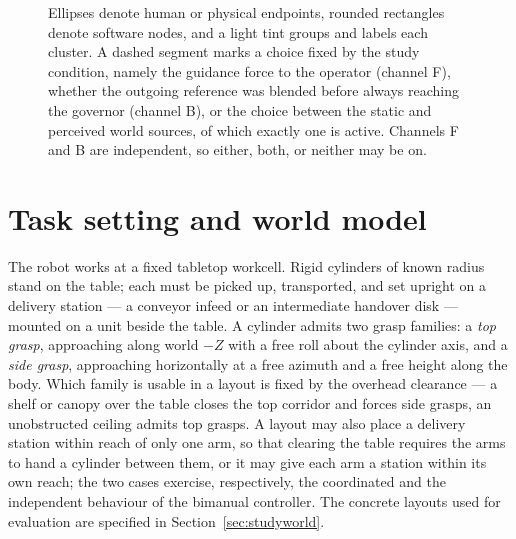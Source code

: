\documentclass[12pt,a4paper,twoside,openright]{report}
\begin{document}
\begin{figure}[t]
\caption{Ellipses denote human or physical endpoints, rounded rectangles denote software nodes, and a light tint groups and labels each cluster. A dashed segment marks a choice fixed by the study condition, namely the guidance force to the operator (channel F), whether the outgoing reference was blended before always reaching the governor (channel B), or the choice between the static and perceived world sources, of which exactly one is active. Channels F and B are independent, so either, both, or neither may be on.}
\label{fig:arch}
\end{figure}

\section{Task setting and world model}
\label{sec:task}

The robot works at a fixed tabletop workcell. Rigid cylinders of known radius stand on the table; each must be picked up, transported, and set upright on a delivery station --- a conveyor infeed or an intermediate handover disk --- mounted on a unit beside the table. A cylinder admits two grasp families: a \emph{top grasp}, approaching along world $-Z$ with a free roll about the cylinder axis, and a \emph{side grasp}, approaching horizontally at a free azimuth and a free height along the body. Which family is usable in a layout is fixed by the overhead clearance --- a shelf or canopy over the table closes the top corridor and forces side grasps, an unobstructed ceiling admits top grasps. A layout may also place a delivery station within reach of only one arm, so that clearing the table requires the arms to hand a cylinder between them, or it may give each arm a station within its own reach; the two cases exercise, respectively, the coordinated and the independent behaviour of the bimanual controller. The concrete layouts used for evaluation are specified in Section~\ref{sec:studyworld}.
\end{document}
